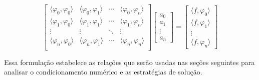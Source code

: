 \begin{equation*}
    \begin{bmatrix}
    \langle \varphi_0, \varphi_0 \rangle &
    \langle \varphi_0, \varphi_1 \rangle &
    \cdots &
    \langle \varphi_0, \varphi_n \rangle \\
    \langle \varphi_1, \varphi_0 \rangle &
    \langle \varphi_1, \varphi_1 \rangle &
    \cdots &
    \langle \varphi_1, \varphi_n \rangle \\
    \vdots & \vdots & \ddots & \vdots \\
    \langle \varphi_n, \varphi_0 \rangle &
    \langle \varphi_n, \varphi_1 \rangle &
    \cdots &
    \langle \varphi_n, \varphi_n \rangle \\
    \end{bmatrix}
    \begin{bmatrix}
        a_0 \\ a_1 \\ \vdots \\ a_n
    \end{bmatrix}
    = \begin{bmatrix}
        \langle f,\varphi_0 \rangle \\
        \langle f,\varphi_1 \rangle \\
        \vdots \\
        \langle f,\varphi_n \rangle
    \end{bmatrix}
\end{equation*}

Essa formulação estabelece as relações que serão usadas nas seções seguintes
para analisar o condicionamento numérico e as estratégias de solução.
